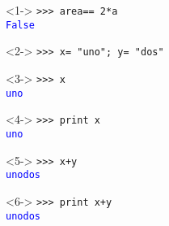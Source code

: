 \documentclass[12pt]{beamer}
\begin{document}
\begin{frame}[fragile]
\fontsize{12}{12}\selectfont
\begin{minipage}{5.5cm}
\begin{exampleblock}{}<1->
 \verb|>>> area== 2*a| \\
 \pause
 \textcolor{blue}{\texttt{False}}
\end{exampleblock}
\begin{exampleblock}{}<2->
 \verb|>>> x= "uno"; y= "dos"| \\
\end{exampleblock}
\begin{exampleblock}{}<3->
 \verb|>>> x| \\
 \pause
 \textcolor{blue}{\texttt{uno}}
\end{exampleblock}
\begin{exampleblock}{}<4->
 \verb|>>> print x| \\
 \pause
 \textcolor{blue}{\texttt{uno}}
\end{exampleblock}
\end{minipage}
\hspace{0.5cm}
\begin{minipage}{5.5cm}
\begin{exampleblock}{}<5->
 \verb|>>> x+y| \\
 \pause
 \textcolor{blue}{\texttt{unodos}}
\end{exampleblock}
\begin{exampleblock}{}<6->
 \verb|>>> print x+y| \\
 \pause
 \textcolor{blue}{\texttt{unodos}}
\end{exampleblock}
\end{minipage}
\end{frame}
\end{document}
